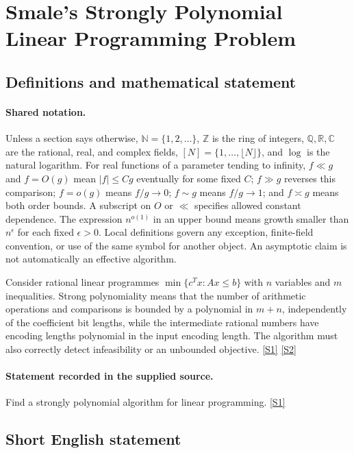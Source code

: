 \documentclass[11pt,a4paper]{article}
\newcommand{\N}{\mathbb{N}}
\newcommand{\Z}{\mathbb{Z}}
\newcommand{\Q}{\mathbb{Q}}
\newcommand{\R}{\mathbb{R}}
\newcommand{\C}{\mathbb{C}}
\newcommand{\sref}[2]{\hyperlink{source:#1:#2}{[S#2]}}
\begin{document}
\section{Smale's Strongly Polynomial Linear Programming Problem}\label{statement}


\subsection{Definitions and mathematical statement}

\paragraph{Shared notation.}Unless a section says otherwise, $\N=\{1,2,\ldots\}$,
$\Z$ is the ring of integers, $\Q,\R,\C$ are the rational, real, and complex
fields, $[N]=\{1,\ldots,\lfloor N\rfloor\}$, and $\log$ is the natural
logarithm. For real functions of a parameter tending to infinity,
$f\ll g$ and $f=O(g)$ mean $|f|\leq Cg$ eventually for some fixed $C$;
$f\gg g$ reverses this comparison; $f=o(g)$ means $f/g\to0$;
$f\sim g$ means $f/g\to1$; and $f\asymp g$ means both order bounds.
A subscript on $O$ or $\ll$ specifies allowed constant dependence.
The expression $n^{o(1)}$ in an upper bound means growth smaller than
$n^\epsilon$ for each fixed $\epsilon>0$. Local definitions govern any
exception, finite-field convention, or use of the same symbol for another
object. An asymptotic claim is not automatically an effective algorithm.



Consider rational linear programmes $\min\{c^Tx:Ax\leq b\}$ with $n$ variables and $m$ inequalities. Strong polynomiality means that the number of arithmetic operations and comparisons is bounded by a polynomial in $m+n$, independently of the coefficient bit lengths, while the intermediate rational numbers have encoding lengths polynomial in the input encoding length. The algorithm must also correctly detect infeasibility or an unbounded objective. \sref{statement}{1} \sref{statement}{2}

\paragraph{Statement recorded in the supplied source.}
Find a strongly polynomial algorithm for linear programming. \sref{statement}{1}

\subsection{Short English statement}
\end{document}
